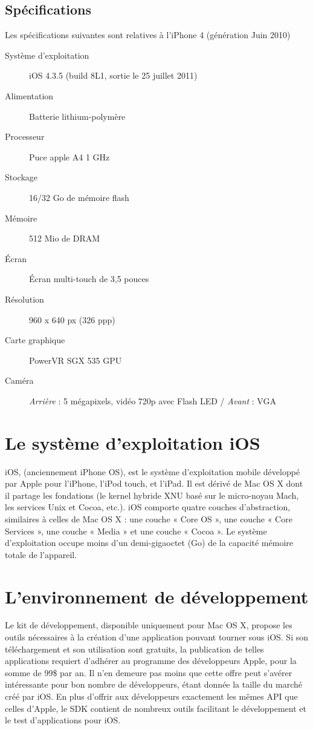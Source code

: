 \documentclass[a4paper,12pt]{report}
\begin{document}
\begin{onehalfspace}
\subsection{Spécifications}
Les spécifications suivantes sont relatives à l'iPhone 4 (génération Juin 2010)
  \begin{description}
  \item[Système d'exploitation] iOS 4.3.5 (build 8L1, sortie le 25 juillet 2011)
  \item[Alimentation] Batterie lithium-polymère
  \item[Processeur] Puce apple A4 1 GHz
  \item[Stockage]  16/32 Go de mémoire flash
  \item[Mémoire] 512 Mio de DRAM
  \item[Écran] Écran multi-touch de 3,5 pouces
  \item[Résolution] 960 x 640 px (326 ppp)
  \item[Carte graphique]  PowerVR SGX 535 GPU
  \item[Caméra] \emph{Arrière} : 5 mégapixels, vidéo 720p avec Flash LED / \emph{Avant} : VGA
  \end{description}

\section{Le système d'exploitation iOS}
iOS, (anciennement iPhone OS), est le système d'exploitation mobile développé par Apple pour l'iPhone, l'iPod touch, et l'iPad. Il est dérivé de Mac OS X dont il partage les fondations (le kernel hybride XNU basé sur le micro-noyau Mach, les services Unix et Cocoa, etc.). iOS comporte quatre couches d'abstraction, similaires à celles de Mac OS X : une couche « Core OS », une couche « Core Services », une couche « Media » et une couche « Cocoa ». Le système d'exploitation occupe moins d'un demi-gigaoctet (Go) de la capacité mémoire totale de l'appareil.

\section{L'environnement de développement}
Le kit de développement, disponible uniquement pour Mac OS X, propose les outils nécessaires à la création d'une application pouvant tourner sous iOS. Si son téléchargement et son utilisation sont gratuits, la publication de telles applications requiert d'adhérer au programme des développeurs Apple, pour la somme de 99\$ par an. Il n'en demeure pas moins que cette offre peut s'avérer intéressante pour bon nombre de développeurs, étant donnée la taille du marché créé par iOS.
En plus d'offrir aux développeurs exactement les mêmes API que celles d'Apple, le SDK contient de nombreux outils facilitant le développement et le test d'applications pour iOS.


\end{onehalfspace}
\end{document}
